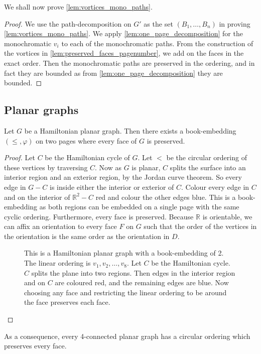 We shall now prove \cref{lem:vortices_mono_paths}.
\begin{proof}
	We use the path-decomposition on \(G'\) as the set \((B_1, \ldots , B_n)\) in proving \cref{lem:vortices_mono_paths}. We apply \cref{lem:one_page_decomposition} for the monochromatic \(v_i\) to each of the monochromatic paths. From the construction of the vortices in \cref{lem:preserved_faces_pagenumber}, we add on the faces in the exact order. Then the monochromatic paths are preserved in the ordering, and in fact they are bounded as from \cref{lem:one_page_decomposition} they are bounded.
\end{proof}
\subsection{Planar graphs}
\begin{lemma}\label{lem:Hamiltonian_preserved_faces}
	Let \(G\) be a Hamiltonian planar graph. Then there exists a book-embedding $(\leq, \varphi)$ on two pages where every face of $G$ is preserved.
\end{lemma}

\begin{proof}
	Let \(C\) be the Hamiltonian cycle of \(G\). Let \(<\) be the circular ordering of these vertices by traversing \(C\). Now as \(G\) is planar, \(C\) splits the surface into an interior region and an exterior region, by the Jordan curve theorem. So every edge in $G - C$ is inside either the interior or exterior of \(C\). Colour every edge in $C$ and on the interior of $\mathbb{R}^2 - C$ red and colour the other edges blue. This is a book-embedding as both regions can be embedded on a single page with the same cyclic ordering. Furthermore, every face is preserved. Because $\mathbb{R}$ is orientable, we can affix an orientation to every face \(F\) on $G$ such that the order of the vertices in the orientation is the same order as the orientation in \(D\).
	\begin{figure}[h!]
		\centering
		
		\caption[Hamiltonian planar graph]{This is a Hamiltonian planar graph with a book-embedding of 2. The linear ordering is $v_1, v_2, \ldots,  v_8$. Let $C$ be the Hamiltonian cycle. $C$ splits the plane into two regions. Then edges in the interior region and on $C$ are coloured red, and the remaining edges are blue. Now choosing any face and restricting the linear ordering to be around the face preserves each face. }\label{fig:hamiltonian_planar}
	\end{figure}
\end{proof}
As a consequence, every 4-connected planar graph has a circular ordering which preserves every face.

